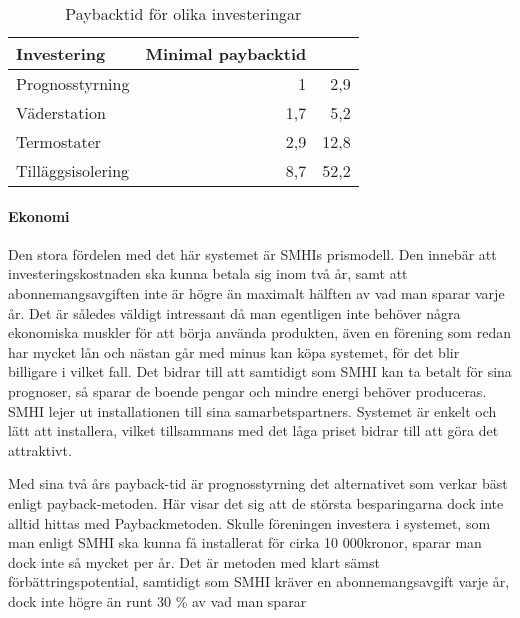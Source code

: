 \begin{table}[hbtp]
\centering
\caption{Paybacktid för olika investeringar}
\label{tbl:payback}

\begin{tabular}
{|l|r|r|}
\hline
\textbf{Investering} & \textbf{Minimal paybacktid} &{\textbf{Maximal paybacktid} \\
\hline
Prognosstyrning &  1 & 2,9 \\ 
\hline
Väderstation & 1,7 & 5,2 \\
\hline
Termostater & 2,9 & 12,8 \\
\hline
Tilläggsisolering & 8,7 & 52,2 \\
\hline
\end{tabular}
\end{table}





\paragraph{Ekonomi}
Den stora fördelen med det här systemet är SMHIs prismodell. Den innebär att investeringskostnaden ska kunna betala sig inom två år, samt att abonnemangsavgiften inte är högre än maximalt hälften av vad man sparar varje år. Det är således väldigt intressant då man egentligen inte behöver några ekonomiska muskler för att börja använda produkten, även en förening som redan har mycket lån och nästan går med minus kan köpa systemet, för det blir billigare i vilket fall. Det bidrar till att samtidigt som SMHI kan ta betalt för sina prognoser, så sparar de boende pengar och mindre energi behöver produceras. SMHI lejer ut installationen till sina samarbetspartners. Systemet är enkelt och lätt att installera, vilket tillsammans med det låga priset bidrar till att göra det attraktivt.

Med sina två års payback-tid är prognosstyrning det alternativet som verkar bäst enligt payback-metoden. Här visar det sig att de största besparingarna dock inte alltid hittas med Paybackmetoden. Skulle föreningen investera i systemet, som man enligt SMHI ska kunna få installerat för cirka 10 000kronor, sparar man dock inte så mycket per år. Det är metoden med klart sämst förbättringspotential, samtidigt som SMHI kräver en abonnemangsavgift varje år, dock inte högre än runt 30 \% av vad man sparar
